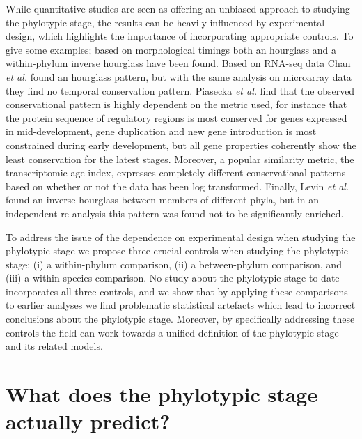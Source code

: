 While quantitative studies are seen as offering an unbiased approach to studying the phylotypic stage, the results can be heavily influenced by experimental design, which highlights the importance of incorporating appropriate controls. To give some examples; based on morphological timings both an hourglass\cite{Cordero2020} and a within-phylum inverse hourglass\cite{OlafRP2003} have been found. Based on RNA-seq data Chan \textit{et al.} found an hourglass pattern, but with the same analysis on microarray data they find no temporal conservation pattern\cite{Chan2021}. Piasecka \textit{et al.} find that the observed conservational pattern is highly dependent on the metric used, for instance that the protein sequence of regulatory regions is most conserved for genes expressed in mid-development, gene duplication and new gene introduction is most constrained during early development, but all gene properties coherently show the least conservation for the latest stages\cite{Piasecka2013}. Moreover, a popular similarity metric, the transcriptomic age index\cite{DomazetLoso2010}, expresses completely different conservational patterns based on whether or not the data has been log transformed\cite{Piasecka2013}. Finally, Levin \textit{et al.} found an inverse hourglass between members of different phyla\cite{Levin2016}, but in an independent re-analysis this pattern was found not to be significantly enriched\cite{Dunn2018}. 

To address the issue of the dependence on experimental design when studying the phylotypic stage we propose three crucial controls when studying the phylotypic stage; (i) a within-phylum comparison, (ii) a between-phylum comparison, and (iii) a within-species comparison. No study about the phylotypic stage to date incorporates all three controls, and we show that by applying these comparisons to earlier analyses we find problematic statistical artefacts which lead to incorrect conclusions about the phylotypic stage. Moreover, by specifically addressing these controls the field can work towards a unified definition of the phylotypic stage and its related models.

\section{What does the phylotypic stage actually predict?}

